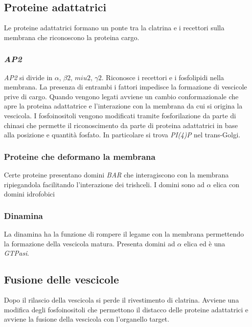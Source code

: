 	\subsection{Proteine adattatrici}
	Le proteine adattatrici formano un ponte tra la clatrina e i recettori sulla membrana che riconoscono la proteina cargo.

		\subsubsection{\emph{AP2}}
		\emph{AP2} si divide in $\alpha$, $\beta2$, $miu2$, $\gamma2$.
		Riconosce i recettori e i fosfolipidi nella membrana.
		La presenza di entrambi i fattori impedisce la formazione di vescicole prive di cargo.
		Quando vengono legati avviene un cambio conformazionale che apre la proteina adattatrice e l'interazione con la membrana da cui si origina la vescicola.
		I fosfoinositoli vengono modificati tramite fosforilazione da parte di chinasi che permette il riconoscimento da parte di proteina adattatrici in base alla posizione e quantit\`a fosfato.
		In particolare si trova \emph{PI(4)P} nel trans-Golgi.

		\subsubsection{Proteine che deformano la membrana}
		Certe proteine presentano domini \emph{BAR} che interagiscono con la membrana ripiegandola facilitando l'interazione dei trishceli.
		I domini sono ad $\alpha$ elica con domini idrofobici

		\subsubsection{Dinamina}
		La dinamina ha la funzione di rompere il legame con la membrana permettendo la formazione della vescicola matura.
		Presenta domini ad $\alpha$ elica ed \`e una \emph{GTPasi}.

	\subsection{Fusione delle vescicole}
	Dopo il rilascio della vescicola si perde il rivestimento di clatrina.
	Avviene una modifica degli fosfoinositoli che permettono il distacco delle proteine adattatrici e avviene la fusione della vescicola con l'organello target.

